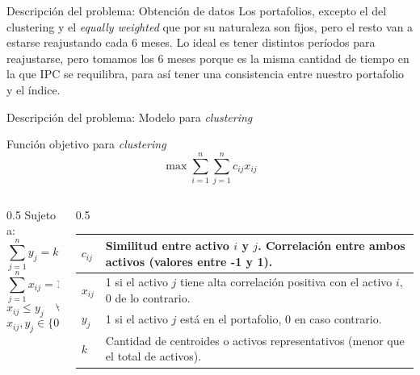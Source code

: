 \documentclass[aspectratio=169,xcolor=dvipsnames]{beamer}
\begin{document}
\begin{frame}{Descripción del problema: Obtención de datos}
    \quad Los portafolios, excepto el del clustering y el \emph{equally weighted} que por su naturaleza
    son fijos, pero el resto van a estarse reajustando cada 6 meses. Lo ideal es tener distintos períodos
    para reajustarse, pero tomamos los 6 meses porque es la misma cantidad de tiempo en la que IPC se
    requilibra, para así tener una consistencia entre nuestro portafolio y el índice.
\end{frame}
\begin{frame}{Descripción del problema: Modelo para \textit{clustering}}
    \begin{block}{Función objetivo para \textit{clustering}}
    \begin{equation}
\max\sum_{i = 1}^{n}{\sum_{j = 1}^{n}{c_{ij}x_{ij}}} \tag{1}
\end{equation}
    \end{block}
        \begin{columns}

    \begin{column}{0.5\textwidth}
        \small
        Sujeto a:
        \begin{equation}
        \sum_{j = 1}^{n} y_{j} = k \tag{1.2}
        \end{equation}
        \begin{equation}
        \sum_{j = 1}^{n} x_{ij} = 1\quad \forall i \tag{1.3}
        \end{equation}
        \begin{equation}
        x_{ij} \leq y_{j} \quad \forall i,j \tag{1.4}
        \end{equation}
        \begin{equation}
        x_{ij}, y_{j} \in \{0,1\} \tag{1.5}
        \end{equation}
    \end{column}

    \begin{column}{0.5\textwidth}
        \small
        \begin{tabularx}{\textwidth}{@{}lX@{}}
        \toprule
        $c_{ij}$ & Similitud entre activo $i$ y $j$. Correlación entre ambos activos (valores entre -1 y 1). \\
        \midrule
        $x_{ij}$ & 1 si el activo $j$ tiene alta correlación positiva con el activo $i$, 0 de lo contrario. \\
        \midrule
        $y_j$ & 1 si el activo $j$ está en el portafolio, 0 en caso contrario. \\
        \midrule
        $k$ & Cantidad de centroides o activos representativos (menor que el total de activos). \\
        \bottomrule
        \end{tabularx}
    \end{column}
\end{columns}
\end{frame}
\end{document}
